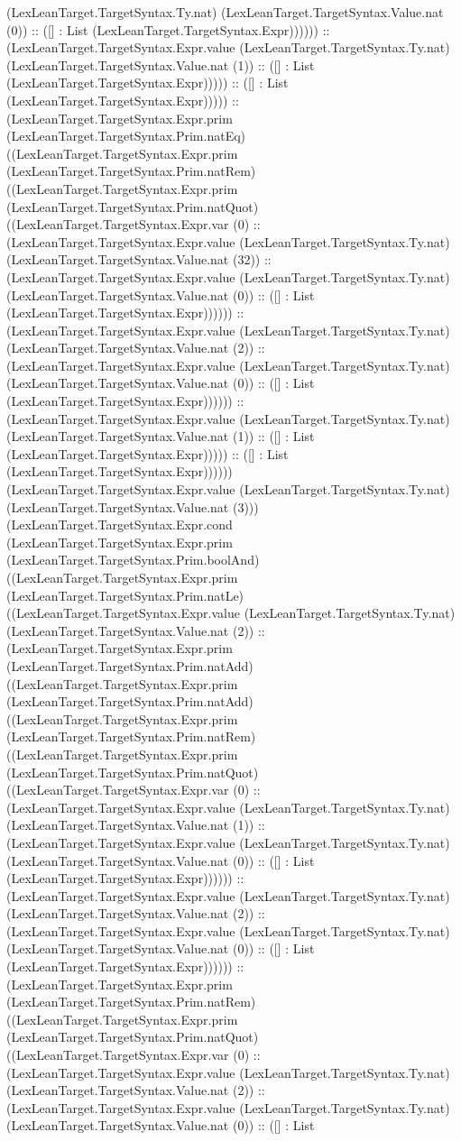 \documentclass[11pt]{article}
\begin{document}
(LexLeanTarget.TargetSyntax.Ty.nat) (LexLeanTarget.TargetSyntax.Value.nat (0)) :: ([] : List (LexLeanTarget.TargetSyntax.Expr)))))) :: (LexLeanTarget.TargetSyntax.Expr.value (LexLeanTarget.TargetSyntax.Ty.nat) (LexLeanTarget.TargetSyntax.Value.nat (1)) :: ([] : List (LexLeanTarget.TargetSyntax.Expr))))) :: ([] : List (LexLeanTarget.TargetSyntax.Expr))))) :: (LexLeanTarget.TargetSyntax.Expr.prim (LexLeanTarget.TargetSyntax.Prim.natEq) ((LexLeanTarget.TargetSyntax.Expr.prim (LexLeanTarget.TargetSyntax.Prim.natRem) ((LexLeanTarget.TargetSyntax.Expr.prim (LexLeanTarget.TargetSyntax.Prim.natQuot) ((LexLeanTarget.TargetSyntax.Expr.var (0) :: (LexLeanTarget.TargetSyntax.Expr.value (LexLeanTarget.TargetSyntax.Ty.nat) (LexLeanTarget.TargetSyntax.Value.nat (32)) :: (LexLeanTarget.TargetSyntax.Expr.value (LexLeanTarget.TargetSyntax.Ty.nat) (LexLeanTarget.TargetSyntax.Value.nat (0)) :: ([] : List (LexLeanTarget.TargetSyntax.Expr)))))) :: (LexLeanTarget.TargetSyntax.Expr.value (LexLeanTarget.TargetSyntax.Ty.nat) (LexLeanTarget.TargetSyntax.Value.nat (2)) :: (LexLeanTarget.TargetSyntax.Expr.value (LexLeanTarget.TargetSyntax.Ty.nat) (LexLeanTarget.TargetSyntax.Value.nat (0)) :: ([] : List (LexLeanTarget.TargetSyntax.Expr)))))) :: (LexLeanTarget.TargetSyntax.Expr.value (LexLeanTarget.TargetSyntax.Ty.nat) (LexLeanTarget.TargetSyntax.Value.nat (1)) :: ([] : List (LexLeanTarget.TargetSyntax.Expr))))) :: ([] : List (LexLeanTarget.TargetSyntax.Expr)))))) (LexLeanTarget.TargetSyntax.Expr.value (LexLeanTarget.TargetSyntax.Ty.nat) (LexLeanTarget.TargetSyntax.Value.nat (3))) (LexLeanTarget.TargetSyntax.Expr.cond (LexLeanTarget.TargetSyntax.Expr.prim (LexLeanTarget.TargetSyntax.Prim.boolAnd) ((LexLeanTarget.TargetSyntax.Expr.prim (LexLeanTarget.TargetSyntax.Prim.natLe) ((LexLeanTarget.TargetSyntax.Expr.value (LexLeanTarget.TargetSyntax.Ty.nat) (LexLeanTarget.TargetSyntax.Value.nat (2)) :: (LexLeanTarget.TargetSyntax.Expr.prim (LexLeanTarget.TargetSyntax.Prim.natAdd) ((LexLeanTarget.TargetSyntax.Expr.prim (LexLeanTarget.TargetSyntax.Prim.natAdd) ((LexLeanTarget.TargetSyntax.Expr.prim (LexLeanTarget.TargetSyntax.Prim.natRem) ((LexLeanTarget.TargetSyntax.Expr.prim (LexLeanTarget.TargetSyntax.Prim.natQuot) ((LexLeanTarget.TargetSyntax.Expr.var (0) :: (LexLeanTarget.TargetSyntax.Expr.value (LexLeanTarget.TargetSyntax.Ty.nat) (LexLeanTarget.TargetSyntax.Value.nat (1)) :: (LexLeanTarget.TargetSyntax.Expr.value (LexLeanTarget.TargetSyntax.Ty.nat) (LexLeanTarget.TargetSyntax.Value.nat (0)) :: ([] : List (LexLeanTarget.TargetSyntax.Expr)))))) :: (LexLeanTarget.TargetSyntax.Expr.value (LexLeanTarget.TargetSyntax.Ty.nat) (LexLeanTarget.TargetSyntax.Value.nat (2)) :: (LexLeanTarget.TargetSyntax.Expr.value (LexLeanTarget.TargetSyntax.Ty.nat) (LexLeanTarget.TargetSyntax.Value.nat (0)) :: ([] : List (LexLeanTarget.TargetSyntax.Expr)))))) :: (LexLeanTarget.TargetSyntax.Expr.prim (LexLeanTarget.TargetSyntax.Prim.natRem) ((LexLeanTarget.TargetSyntax.Expr.prim (LexLeanTarget.TargetSyntax.Prim.natQuot) ((LexLeanTarget.TargetSyntax.Expr.var (0) :: (LexLeanTarget.TargetSyntax.Expr.value (LexLeanTarget.TargetSyntax.Ty.nat) (LexLeanTarget.TargetSyntax.Value.nat (2)) :: (LexLeanTarget.TargetSyntax.Expr.value (LexLeanTarget.TargetSyntax.Ty.nat) (LexLeanTarget.TargetSyntax.Value.nat (0)) :: ([] : List 
\end{document}
